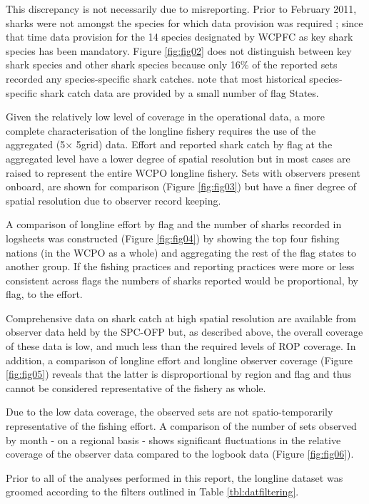 \documentclass[12pt]{SCreport}
\begin{document}
This discrepancy is not necessarily due to misreporting. Prior to February 2011, sharks were not amongst the species for which data provision was required \citep{WCPFC2011_a}; since that time data provision for the 14 species designated by WCPFC as key shark species has been mandatory. Figure \ref{fig:fig02} does not distinguish between key shark species and other shark species because only 16\% of the reported sets recorded any species-specific shark catches. \citet{Clarke2011_b} note that most historical species-specific shark catch data are provided by a small number of flag States.

Given the relatively low level of coverage in the operational data, a more complete characterisation of the longline fishery requires the use of the aggregated (5\degree $\times$ 5\degree grid) data. Effort and reported shark catch by flag at the aggregated level have a lower degree of spatial resolution but in most cases are raised to represent the entire WCPO longline fishery. Sets with observers present onboard, are shown for comparison (Figure \ref{fig:fig03}) but have a finer degree of spatial resolution due to observer record keeping. 

A comparison of longline effort by flag and the number of sharks recorded in logsheets was constructed (Figure \ref{fig:fig04}) by showing the top four fishing nations (in the WCPO as a whole) and aggregating the rest of the flag states to another group. If the fishing practices and reporting practices were more or less consistent across flags the numbers of sharks reported would be proportional, by flag, to the effort.

Comprehensive data on shark catch at high spatial resolution are available from observer data held by the SPC-OFP but, as described above, the overall coverage of these data is low, and much less than the required levels of ROP coverage. In addition, a comparison of longline effort and longline observer coverage (Figure \ref{fig:fig05}) reveals that the latter is disproportional by region and flag and thus cannot be considered representative of the fishery as whole.

Due to the low data coverage, the observed sets are not spatio-temporarily representative of the fishing effort. A comparison of the number of sets observed by month - on a regional basis - shows significant fluctuations in the relative coverage of the observer data compared to the logbook data (Figure \ref{fig:fig06}).

Prior to all of the analyses performed in this report, the longline dataset was groomed according to the filters outlined in Table \ref{tbl:datfiltering}.
\end{document}
